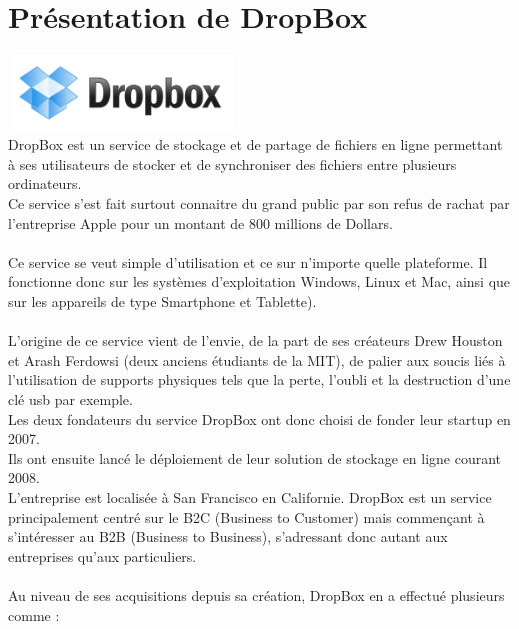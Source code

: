 \documentclass[a4paper, 10pt]{article}
\begin{document}
\section*{Pr\'esentation de DropBox}
\includegraphics[height = 2cm, width = 6cm]{dropbox_logo.png}\\
DropBox est un service de stockage et de partage de fichiers en ligne permettant \`a ses utilisateurs de stocker et
de synchroniser des fichiers entre plusieurs ordinateurs.\\
Ce service s'est fait surtout connaitre du grand public par son refus de rachat
par l'entreprise Apple pour un montant de 800 millions de Dollars.\\ \\
Ce service se veut simple d'utilisation et ce sur n'importe quelle plateforme.
Il fonctionne donc sur les syst\`emes d'exploitation Windows, Linux et Mac, ainsi que sur les appareils de type Smartphone et Tablette).\\ \\
L'origine de ce service vient de l'envie, de la part de ses cr\'eateurs Drew Houston et Arash Ferdowsi (deux anciens \'etudiants de la MIT),
de palier aux soucis li\'es \`a l'utilisation de supports physiques tels que la perte, l'oubli et la destruction d'une cl\'e usb par exemple.\\
Les deux fondateurs du service DropBox ont donc choisi de fonder leur startup en 2007.\\
Ils ont ensuite lanc\'e le d\'eploiement de leur solution de stockage en ligne courant 2008.\\
L'entreprise est localis\'ee \`a San Francisco en Californie.
\newpage
\noindent
DropBox est un service principalement centr\'e sur le B2C (Business to Customer) mais commençant \`a s'int\'eresser au B2B (Business to Business),
s'adressant donc autant aux entreprises qu'aux particuliers.\\ \\
Au niveau de ses acquisitions depuis sa cr\'eation, DropBox en a effectu\'e plusieurs comme :
\end{document}
